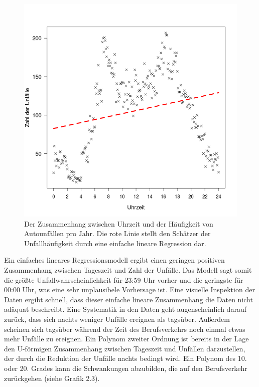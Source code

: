 \begin{figure}[!ht]
  \caption{Der Zusammenhang zwischen Uhrzeit und der Häufigkeit von Autounfällen pro
    Jahr.  Die rote Linie stellt den Schätzer der Unfallhäufigkeit durch eine
    einfache lineare Regression dar. }  \centering
  \includegraphics[width=1\textwidth]{chapters/svm/poly_1.png}
\end{figure}


Ein einfaches lineares Regressionsmodell ergibt einen geringen positiven Zusammenhang
zwischen Tageszeit und Zahl der Unfälle. Das Modell sagt somit die größte
Unfallwahrscheinlichkeit für 23:59 Uhr vorher und die geringste für 00:00 Uhr, was
eine sehr unplausibele Vorhersage ist. Eine visuelle Inspektion der Daten ergibt
schnell, dass dieser einfache lineare Zusammenhang die Daten nicht adäquat
beschreibt. Eine Systematik in den Daten geht augenscheinlich darauf zurück, dass
sich nachts weniger Unfälle ereignen als tagsüber. Außerdem scheinen sich tagsüber
während der Zeit des Berufsverkehrs noch einmal etwas mehr Unfälle zu ereignen. Ein
Polynom zweiter Ordnung ist bereits in der Lage den U-förmigen Zusammenhang zwischen
Tageszeit und Unfällen darzustellen, der durch die Reduktion der Unfälle nachts
bedingt wird. Ein Polynom des 10. oder 20. Grades kann die Schwankungen abzubilden,
die auf den Berufsverkehr zurückgehen (siehe Grafik 2.3).

